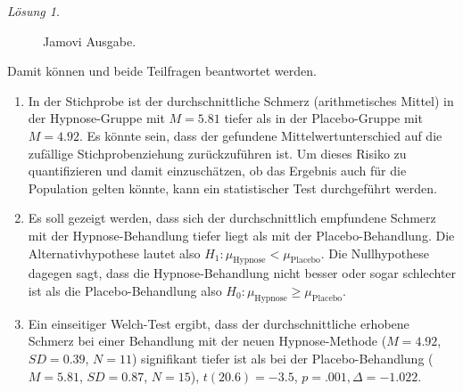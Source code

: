 \documentclass[
]{book}
\providecommand{\tightlist}{%
  \setlength{\itemsep}{0pt}\setlength{\parskip}{0pt}}
\theoremstyle{definition}
\theoremstyle{definition}
\theoremstyle{definition}
\theoremstyle{definition}
\theoremstyle{remark}
\newtheorem*{solution}{Lösung}
\begin{document}
\begin{solution}
\begin{figure}
{}

\caption{Jamovi Ausgabe.}\label{fig:sol-hypnose-output}
\end{figure}

Damit können und beide Teilfragen beantwortet werden.

\begin{enumerate}
\def\labelenumi{\alph{enumi})}
\tightlist
\item
  In der Stichprobe ist der durchschnittliche Schmerz (arithmetisches Mittel) in der Hypnose-Gruppe mit \(M = 5.81\) tiefer als in der Placebo-Gruppe mit \(M = 4.92\). Es könnte sein, dass der gefundene Mittelwertunterschied auf die zufällige Stichprobenziehung zurückzuführen ist. Um dieses Risiko zu quantifizieren und damit einzuschätzen, ob das Ergebnis auch für die Population gelten könnte, kann ein statistischer Test durchgeführt werden.
\item
  Es soll gezeigt werden, dass sich der durchschnittlich empfundene Schmerz mit der Hypnose-Behandlung tiefer liegt als mit der Placebo-Behandlung. Die Alternativhypothese lautet also \(H_1: \mu_\text{Hypnose} < \mu_\text{Placebo}\). Die Nullhypothese dagegen sagt, dass die Hypnose-Behandlung nicht besser oder sogar schlechter ist als die Placebo-Behandlung also \(H_0: \mu_\text{Hypnose} \geq \mu_\text{Placebo}\).
\item
  Ein einseitiger Welch-Test ergibt, dass der durchschnittliche erhobene Schmerz bei einer Behandlung mit der neuen Hypnose-Methode (\(M = 4.92\), \(SD = 0.39\), \(N = 11\)) signifikant tiefer ist als bei der Placebo-Behandlung (\(M = 5.81\), \(SD = 0.87\), \(N = 15\)), \(t(20.6) = -3.5\), \(p = .001, \Delta = -1.022\).
\end{enumerate}

\end{solution}
\end{document}
